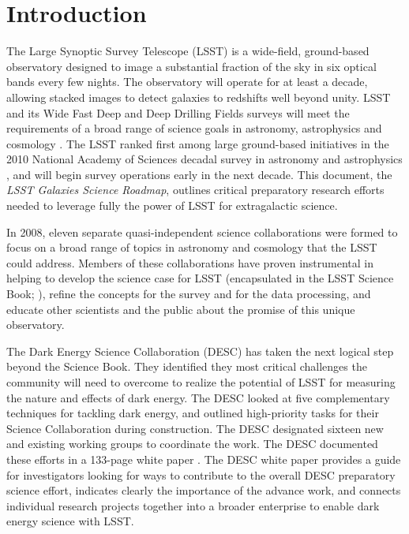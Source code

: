 
\chapter[Introduction]{Introduction}
\label{ch:intro}

{\justify
The Large Synoptic Survey Telescope (LSST) is a wide-field, ground-based
observatory designed to image a substantial fraction of the sky in six optical
bands every few nights. 
The observatory will operate for at least a decade, allowing 
stacked images to detect galaxies to redshifts well beyond unity. LSST and
its Wide Fast Deep and Deep Drilling Fields surveys will meet 
the requirements of a broad range of science goals in astronomy, astrophysics and cosmology
\citep{ivezic2008a}. 
The LSST ranked first among large ground-based initiatives in the
2010 National Academy of Sciences decadal survey in astronomy and astrophysics \citep{nrc2010a},
and will begin survey operations early in the next decade.
This document, the {\it LSST Galaxies Science Roadmap}, outlines critical preparatory research efforts needed 
to leverage fully the power of LSST for extragalactic science. 

In 2008, eleven separate quasi-independent science collaborations were formed to
focus on a broad range of topics in astronomy and cosmology that the LSST could
address. Members of these collaborations have proven instrumental in helping to
develop the science case for LSST (encapsulated in the LSST Science Book;
\citealt{LSSTSciBook}), 
refine the concepts for the survey and for the data processing, and educate
other scientists and the public about the promise of this unique observatory.

The Dark Energy Science Collaboration (DESC) has taken the
next logical step beyond the Science Book. They identified they most critical
challenges the community will need to overcome
to realize the potential of LSST for
measuring the nature and effects of dark energy. The
DESC looked at five complementary
techniques for tackling dark energy, and outlined high-priority tasks for their
Science Collaboration during construction. The DESC designated sixteen 
new and existing working
groups to coordinate the work. The DESC documented these efforts
in a 133-page white paper \citep{LSSTDESC}. The DESC white
paper provides a guide for investigators looking for ways to contribute to the
overall DESC preparatory science effort, 
indicates clearly the importance of the advance work, and 
connects individual research projects together into a broader 
enterprise to enable dark energy science with LSST.

}
